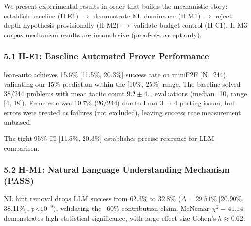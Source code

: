 
We present experimental results in order that builds the mechanistic story: establish baseline (H-E1) $\rightarrow$ demonstrate NL dominance (H-M1) $\rightarrow$ reject depth hypothesis provisionally (H-M2) $\rightarrow$ validate budget control (H-C1). H-M3 corpus mechanism results are inconclusive (proof-of-concept only).

\subsubsection{5.1 H-E1: Baseline Automated Prover Performance}

lean-auto achieves 15.6\% [11.5\%, 20.3\%] success rate on miniF2F (N=244), validating our 15\% prediction within the [10\%, 25\%] range. The baseline solved 38/244 problems with mean tactic count 9.$2\pm 4.1$ evaluations (median=10, range [4, 18]). Error rate was 10.7\% (26/244) due to Lean $3\rightarrow 4$ porting issues, but errors were treated as failures (not excluded), leaving success rate measurement unbiased.

\begin{table}[htbp]
\centering
{}
\end{table}

The tight 95\% CI [11.5\%, 20.3\%] establishes precise reference for LLM comparison.

\subsubsection{5.2 H-M1: Natural Language Understanding Mechanism (PASS)}

NL hint removal drops LLM success from 62.3\% to 32.8\% ($\Delta =29.51$\% [20.90\%, 38.11\%], p<$10^{-9})$, validating the ~60\% contribution claim. McNemar $\chi^{2}=41.14$ demonstrates high statistical significance, with large effect size Cohen's $h\approx 0.62$.

